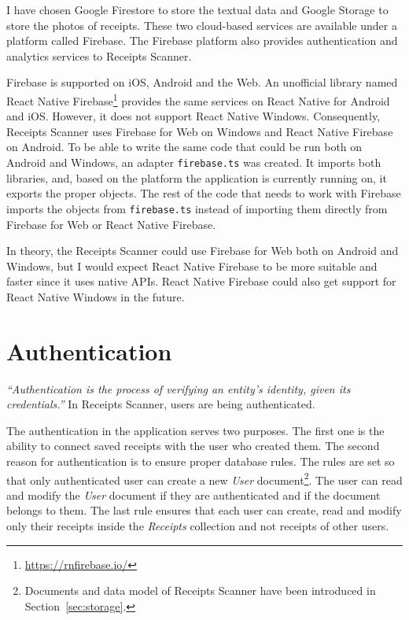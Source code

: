 \documentclass[
  printed, %
  table,   %
  oneside, %
  lof,     %
  lot,     %
]{fithesis3}
\begin{document}
I have chosen Google Firestore to store the textual data and Google Storage to store the photos of receipts. These two cloud-based services are available under a platform called Firebase. The Firebase platform also provides authentication and analytics services to Receipts Scanner.

\label{phantom:firebase_adapter}
Firebase is supported on iOS, Android and the Web. An unofficial library named React Native Firebase\footnote{\url{https://rnfirebase.io/}} provides the same services on React Native for Android and iOS. However, it does not support React Native Windows. Consequently, Receipts Scanner uses Firebase for Web on Windows and React Native Firebase on Android. To be able to write the same code that could be run both on Android and Windows, an adapter \texttt{firebase.ts} was created. It imports both libraries, and, based on the platform the application is currently running on, it exports the proper objects. The rest of the code that needs to work with Firebase imports the objects from \texttt{firebase.ts} instead of importing them directly from Firebase for Web or React Native Firebase.

In theory, the Receipts Scanner could use Firebase for Web both on Android and Windows, but I would expect React Native Firebase to be more suitable and faster since it uses native APIs. React Native Firebase could also get support for React Native Windows in the future.

\section{Authentication}
\label{ref:authentication}
\textit{``Authentication is the process of verifying an entity’s identity, given its credentials.''} \cite{Cankaya2011Authentication} In Receipts Scanner, users are being authenticated.

The authentication in the application serves two purposes. The first one is the ability to connect saved receipts with the user who created them. The second reason for authentication is to ensure proper database rules. The rules are set so that only authenticated user can create a new \textit{User} document\footnote{Documents and data model of Receipts Scanner have been introduced in Section~\ref{sec:storage}.}. The user can read and modify the \textit{User} document if they are authenticated and if the document belongs to them. The last rule ensures that each user can create, read and modify only their receipts inside the \textit{Receipts} collection and not receipts of other users.
\end{document}
